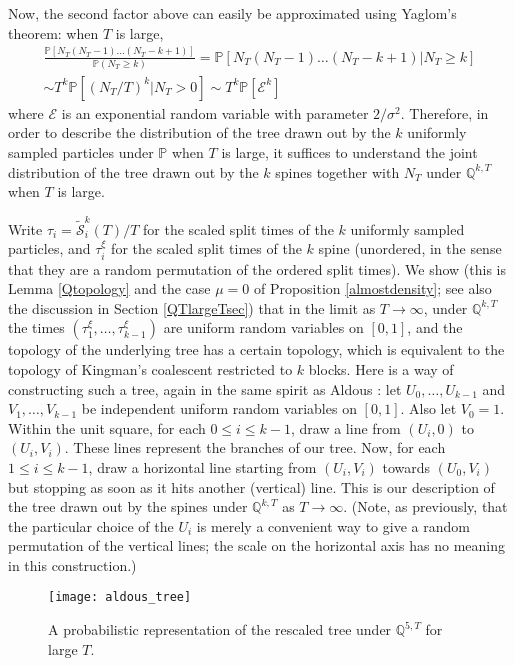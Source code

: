 \documentclass{article}
\theoremstyle{plain}
\theoremstyle{definition}
\newcommand{\Q}{\mathbb{Q}}
\renewcommand{\P}{\mathbb{P}}
\begin{document}
Now, the second factor above can easily be approximated using Yaglom's theorem: when $T$ is large,
\begin{multline}\label{heuristiceq2}
\frac{\P[N_T (N_T-1)\ldots (N_T-k+1)]}{\P(N_T\ge k)} = \P[N_T (N_T-1)\ldots (N_T-k+1)|N_T\ge k]\\
\sim T^k\P[(N_T/T)^k | N_T>0] \sim T^k \P[\mathcal E^k]
\end{multline}
where $\mathcal E$ is an exponential random variable with parameter $2/\sigma^2$. Therefore, in order to describe the distribution of the tree drawn out by the $k$ uniformly sampled particles under $\P$ when $T$ is large, it suffices to understand the joint distribution of the tree drawn out by the $k$ spines together with $N_T$ under $\Q^{k,T}$ when $T$ is large.




Write $\tau_i = \tilde {\mathcal S}^k_i(T)/T$ for the scaled split times of the $k$ uniformly sampled particles, and $\tau_i^\xi$ for the scaled split times of the $k$ spine (unordered, in the sense that they are a random permutation of the ordered split times). We show (this is Lemma \ref{Qtopology} and the case $\mu=0$ of Proposition \ref{almostdensity}; see also the discussion in Section \ref{QTlargeTsec}) that in the limit as $T\to\infty$, under $\Q^{k,T}$ the times $(\tau^\xi_1,\ldots,\tau^\xi_{k-1})$ are uniform random variables on $[0,1]$, and the topology of the underlying tree has a certain topology, which is equivalent to the topology of Kingman's coalescent restricted to $k$ blocks. Here is a way of constructing such a tree, again in the same spirit as Aldous \cite[Section 4.2]{aldous:coalescence_review}: let $U_0,\ldots,U_{k-1}$ and $V_1,\ldots,V_{k-1}$ be independent uniform random variables on $[0,1]$. Also let $V_0=1$. Within the unit square, for each $0\le i\le k-1$, draw a line from $(U_i,0)$ to $(U_i,V_i)$. These lines represent the branches of our tree. Now, for each $1\le i\le k-1$, draw a horizontal line starting from $(U_i,V_i)$ towards $(U_0,V_i)$ but stopping as soon as it hits another (vertical) line. This is our description of the tree drawn out by the spines under $\Q^{k,T}$ as $T\to\infty$. (Note, as previously, that the particular choice of the $U_i$ is merely a convenient way to give a random permutation of the vertical lines; the scale on the horizontal axis has no meaning in this construction.)

\begin{figure}[h!]
  \centering
   \texttt{[image: aldous\_tree]}
   \vspace{0mm}
  \caption{\small{A probabilistic representation of the rescaled tree under $\Q^{5,T}$ for large $T$.}}
  \end{figure}
\end{document}
